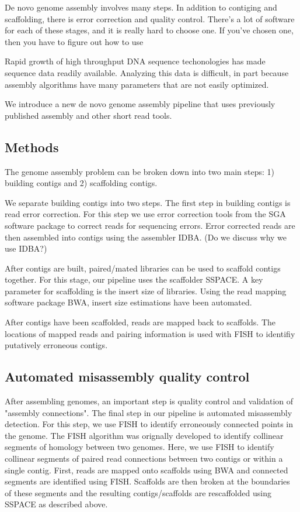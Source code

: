 \documentclass{bioinfo}
\begin{document}
De novo genome assembly involves many steps. In addition to contiging and scaffolding,
there is error correction and quality control. There's a lot of software for 
each of these stages, and it is really hard to choose one. If you've chosen one, then 
you have to figure out how to use  


Rapid growth of high throughput DNA sequence techonologies has made sequence 
data readily available. Analyzing this data is difficult, in part because 
assembly algorithms have many parameters that are not easily optimized. 

We introduce a new de novo genome assembly pipeline that uses previously 
published assembly and other short read tools.  

\begin{methods}
\section{Methods}
The genome assembly problem can be broken down into two main steps: 1) building
contigs and 2) scaffolding contigs. 

We separate building contigs into two steps. The first step in building contigs
is read error correction. For this step we use error correction tools from the
SGA software package to correct reads for sequencing errors. Error corrected reads
are then assembled into contigs using the assembler IDBA. (Do we discuss why we use IDBA?)  

After contigs are built, paired/mated libraries can be used to scaffold contigs 
together. For this stage, our pipeline uses the scaffolder SSPACE. A key 
parameter for scaffolding is the insert size of libraries. Using the read
mapping software package BWA, insert size estimations have been automated. 

After contigs have been scaffolded, reads are mapped back to scaffolds. The locations
of mapped reads and pairing information is used with FISH to identifiy putatively erroneous 
contigs. 



\end{methods}

\subsection{Automated misassembly quality control}

After assembling genomes, an important step is quality control and validation
of "assembly connections". The final step in our pipeline is automated 
misassembly detection. For this step, we use FISH to identify erroneously
connected points in the genome. The FISH algorithm was orignally developed
to identify collinear segments of homology between two genomes. Here, we use
FISH to identify collinear segments of paired read connections between two contigs
or within a single contig. First, reads are mapped onto scaffolds using BWA and 
connected segments are identified using 
FISH. Scaffolds are then broken at the boundaries of these segments and the 
resulting contigs/scaffolds are rescaffolded using SSPACE as described above.
\end{document}
